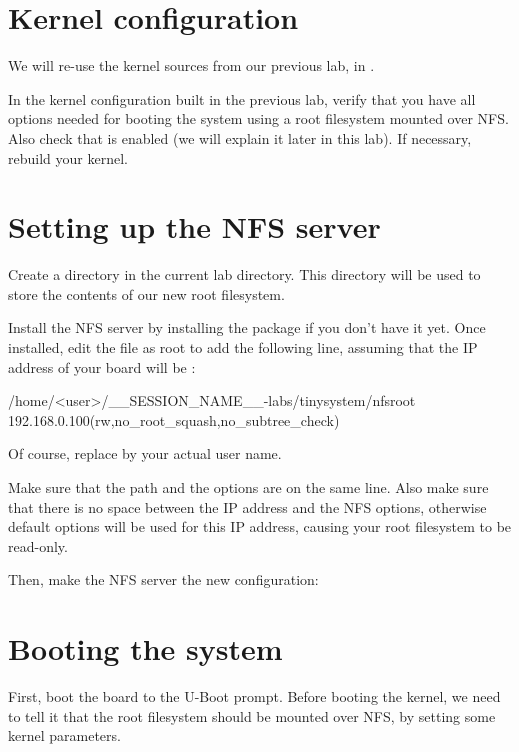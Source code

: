 \section{Kernel configuration}

We will re-use the kernel sources from our previous lab, in
.

In the kernel configuration built in the previous lab, verify that you
have all options needed for booting the system using a root filesystem
mounted over NFS. Also check that  is
enabled (we will explain it later in this lab). If necessary, rebuild
your kernel.

\section{Setting up the NFS server}

Create a  directory in the current lab directory. This
 directory will be used to store the contents of our new
root filesystem.

Install the NFS server by installing the 
package if you don't have it yet. Once installed, edit the
 file as root to add the following line, assuming that the
IP address of your board will be :

\begin{fileinput}
/home/<user>/__SESSION_NAME__-labs/tinysystem/nfsroot 192.168.0.100(rw,no_root_squash,no_subtree_check)
\end{fileinput}

Of course, replace  by your actual user name.

Make sure that the path and the options are on the same line.
Also make sure that there is no space between the IP address and the NFS
options, otherwise default options will be used for this IP address,
causing your root filesystem to be read-only.

Then, make the NFS server the new configuration:


\section{Booting the system}

First, boot the board to the U-Boot prompt. Before booting the kernel,
we need to tell it that the root filesystem should be mounted over
NFS, by setting some kernel parameters.

